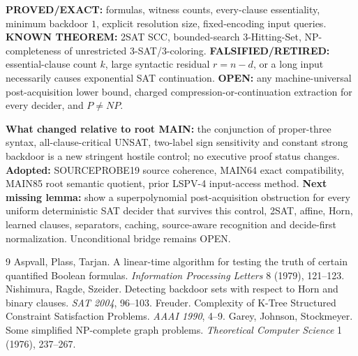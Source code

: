 \documentclass[11pt]{article}
\begin{document}
\noindent\textbf{PROVED/EXACT:} formulas, witness counts, every-clause essentiality, minimum backdoor $1$, explicit resolution size, fixed-encoding input queries. \textbf{KNOWN THEOREM:} 2SAT SCC, bounded-search 3-Hitting-Set, NP-completeness of unrestricted 3-SAT/3-coloring. \textbf{FALSIFIED/RETIRED:} essential-clause count $k$, large syntactic residual $r=n-d$, or a long input necessarily causes exponential SAT continuation. \textbf{OPEN:} any machine-universal post-acquisition lower bound, charged compression-or-continuation extraction for every decider, and $P\ne NP$.

\noindent\textbf{What changed relative to root MAIN:} the conjunction of proper-three syntax, all-clause-critical UNSAT, two-label sign sensitivity and constant strong backdoor is a new stringent hostile control; no executive proof status changes. \textbf{Adopted:} SOURCEPROBE19 source coherence, MAIN64 exact compatibility, MAIN85 root semantic quotient, prior LSPV-4 input-access method. \textbf{Next missing lemma:} show a superpolynomial post-acquisition obstruction for every uniform deterministic SAT decider that survives this control, 2SAT, affine, Horn, learned clauses, separators, caching, source-aware recognition and decide-first normalization. Unconditional bridge remains OPEN.

\begin{thebibliography}{9}
 Aspvall, Plass, Tarjan. A linear-time algorithm for testing the truth of certain quantified Boolean formulas. \emph{Information Processing Letters} 8 (1979), 121--123.
 Nishimura, Ragde, Szeider. Detecting backdoor sets with respect to Horn and binary clauses. \emph{SAT 2004}, 96--103.
 Freuder. Complexity of K-Tree Structured Constraint Satisfaction Problems. \emph{AAAI 1990}, 4--9.
 Garey, Johnson, Stockmeyer. Some simplified NP-complete graph problems. \emph{Theoretical Computer Science} 1 (1976), 237--267.
\end{thebibliography}
\end{document}
